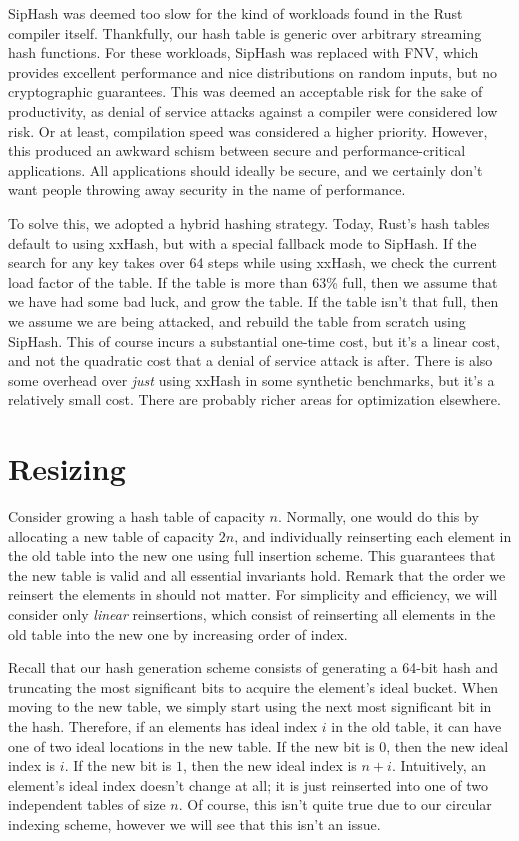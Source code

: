 \documentclass{cccg13}
\begin{document}
SipHash was deemed too slow for the kind of workloads found in the Rust
compiler itself. Thankfully, our hash table is generic over arbitrary
streaming hash functions. For these workloads, SipHash was replaced with
FNV, which provides excellent performance and nice distributions on random
inputs, but no cryptographic guarantees. This was deemed an acceptable risk
for the sake of productivity, as denial of service attacks against a compiler
were considered low risk. Or at least, compilation speed was considered a
higher priority. However, this produced an awkward schism between secure and
performance-critical applications. All applications should ideally be secure,
and we certainly don't want people throwing away security in the name of
performance.

To solve this, we adopted a hybrid hashing strategy. Today, Rust's hash tables
default to using xxHash, but with a special fallback mode to SipHash. If the
search for any key takes over 64 steps while using xxHash, we check the
current load factor of the table. If the table is more than 63\% full, then we
assume that we have had some bad luck, and grow the table. If the table isn't
that full, then we assume we are being attacked, and rebuild the table from
scratch using SipHash. This of course incurs a substantial one-time cost, but
it's a linear cost, and not the quadratic cost that a denial of service attack
is after. There is also some overhead over \emph{just} using xxHash in some
synthetic benchmarks, but it's a relatively small cost. There are probably
richer areas for optimization elsewhere.





\section{Resizing}

Consider growing a hash table of capacity $n$. Normally, one would do this by
allocating a new table of capacity $2n$, and individually reinserting each
element in the old table into the new one using full insertion scheme. This
guarantees that the new table is valid and all essential invariants hold.
Remark that the order we reinsert the elements in should not
matter. For simplicity and efficiency, we will consider only \emph{linear}
reinsertions, which consist of reinserting all elements in the old table into
the new one by increasing order of index.

Recall that our hash generation scheme consists of generating a 64-bit hash
and truncating the most significant bits to acquire the element's ideal
bucket. When moving to the new table, we simply start using the next most
significant bit in the hash. Therefore, if an elements has ideal index $i$ in
the old table, it can have one of two ideal locations in the new table. If the
new bit is $0$, then the new ideal index is $i$. If the new bit is $1$, then
the new ideal index is $n + i$. Intuitively, an element's ideal index doesn't
change at all; it is just reinserted into one of two independent tables of
size $n$. Of course, this isn't quite true due to our circular indexing
scheme, however we will see that this isn't an issue.
\end{document}
